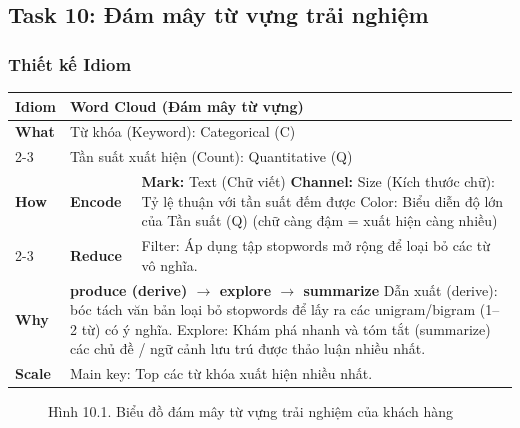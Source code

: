 \subsection{Task 10: Đám mây từ vựng trải nghiệm}

\subsubsection{Thiết kế Idiom}

\begin{table}[H]
\centering
\renewcommand{\arraystretch}{1.1}
\begin{tabularx}{\textwidth}{|l|l|X|}
\hline
\textbf{Idiom} & \multicolumn{2}{l|}{\textbf{Word Cloud (Đám mây từ vựng)}} \\ \hline
\textbf{What}
& \multicolumn{2}{X|}{Từ khóa (Keyword): Categorical (C)} \\ \cline{2-3}
& \multicolumn{2}{X|}{Tần suất xuất hiện (Count): Quantitative (Q)} \\ \hline
\textbf{How}
& \textbf{Encode} &
\textbf{Mark:} Text (Chữ viết) \newline
\textbf{Channel:} \newline
\hspace*{1em} Size (Kích thước chữ): Tỷ lệ thuận với tần suất đếm được \newline
\hspace*{1em} Color: Biểu diễn độ lớn của Tần suất (Q) (chữ càng đậm = xuất hiện càng nhiều) \\ \cline{2-3}
& \textbf{Reduce} &
Filter: Áp dụng tập stopwords mở rộng để loại bỏ các từ vô nghĩa. \\ \hline
\textbf{Why} & \multicolumn{2}{X|}{
\textbf{produce (derive) $\rightarrow$ explore $\rightarrow$ summarize} \newline
Dẫn xuất (derive): bóc tách văn bản loại bỏ stopwords để lấy ra các unigram/bigram (1--2 từ) có ý nghĩa. Explore: Khám phá nhanh và tóm tắt (summarize) các chủ đề / ngữ cảnh lưu trú được thảo luận nhiều nhất.
} \\ \hline
\textbf{Scale} & \multicolumn{2}{X|}{
Main key: Top các từ khóa xuất hiện nhiều nhất.
} \\ \hline
\end{tabularx}
\end{table}

\begin{figure}[H]
    \centering
    \caption{Hình 10.1. Biểu đồ đám mây từ vựng trải nghiệm của khách hàng}
    \label{fig:domain-task10-chart1}
\end{figure}

